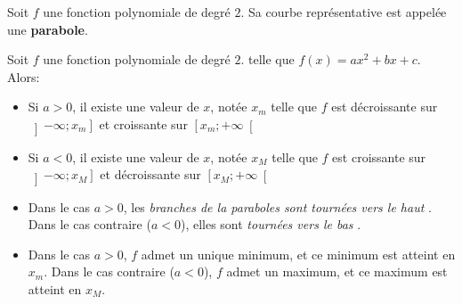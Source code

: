 \documentclass{poly}
\begin{document}
\begin{minipage}{0.45\textwidth}
\begin{center}
\end{center}   
\end{minipage}
\hfill
\begin{minipage}{0.45\textwidth}
\begin{center}
\end{center}    
\end{minipage}
\vspace*{0.5cm}
\begin{definition}
Soit $f$ une fonction polynomiale de degré $2$. Sa courbe représentative est appelée une \textbf{parabole}.
\end{definition}
\begin{proposition}
Soit $f$ une fonction polynomiale de degré $2$. telle que $f(x) = ax^2 + bx + c$. Alors:
\begin{itemize}
\item Si $a > 0$, il existe une valeur de $x$, notée $x_m$ telle que $f$ est décroissante sur $\left] - \infty; x_m \right]$ et croissante sur $\left[x_m; + \infty \right[$
\item Si $a < 0$, il existe une valeur de $x$, notée $x_M$ telle que $f$ est croissante sur $\left] - \infty; x_M \right]$ et décroissante sur $\left[x_M; + \infty \right[$
\end{itemize}
\end{proposition}
\begin{remark}
\hfill
\begin{itemize}
\item Dans le cas $a > 0$, les \emph{\og branches de la paraboles sont tournées vers le haut \fg}. Dans le cas contraire ($a < 0$), elles sont \emph{\og tournées vers le bas \fg}.
\item Dans le cas $a > 0$, $f$ admet un unique minimum, et ce minimum est atteint en $x_m$. Dans le cas contraire ($a < 0$), $f$ admet un maximum, et ce maximum est atteint en $x_M$. 
\end{itemize}
\end{remark}
\newpage
\end{document}
